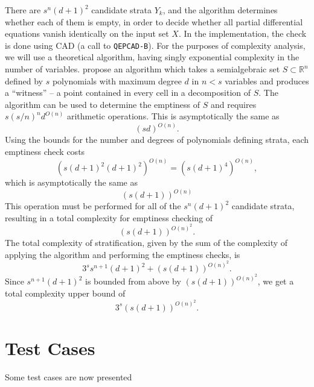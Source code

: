 \documentclass[
]{book}
\theoremstyle{definition}
\theoremstyle{definition}
\theoremstyle{definition}
\theoremstyle{definition}
\theoremstyle{remark}
\begin{document}
There are \(s^{n} (d + 1)^2\) candidate strata \(Y_k\), and the algorithm determines whether each of them is empty, in order to decide whether all partial differential equations vanish identically on the input set \(X\).
In the implementation, the check is done using CAD (a call to \texttt{QEPCAD-B}).
For the purposes of complexity analysis, we will use a theoretical algorithm, having singly exponential complexity in the number of variables.
\citet{bpr98} propose an algorithm which takes a semialgebraic set \(S \subset \mathbb{R}^n\) defined by \(s\) polynomials with maximum degree \(d\) in \(n < s\) variables and produces a ``witness'' -- a point contained in every cell in a decomposition of \(S\).
The algorithm can be used to determine the emptiness of \(S\) and requires \(s(s/n)^n d^{O(n)}\) arithmetic operations.
This is asymptotically the same as \[(sd)^{O(n)}.\]
Using the bounds for the number and degrees of polynomials defining strata, each emptiness check costs
\[
\left(s(d+1)^{2}(d+1)^{2}\right)^{O(n)}=\left(s(d+1)^{4}\right)^{O(n)},
\]
which is asymptotically the same as
\[
\left(s(d+1)\right)^{O(n)}
\]
This operation must be performed for all of the
\(s^{n} (d + 1)^{2}\)
candidate strata, resulting in a total complexity for emptiness checking of
\[
\left(s(d+1)\right)^{O(n)^{2}}.
\]
The total complexity of stratification, given by the sum of the complexity of applying the algorithm and performing the emptiness checks, is
\[
3^{s}s^{n+1}(d+1)^{2}+\left(s(d+1)\right)^{O(n)^{2}}.
\]
Since \(s^{n+1}(d+1)^{2}\) is bounded from above by \(\left(s(d+1)\right)^{O(n)^{2}}\), we get a total complexity upper bound of
\[
3^{s}\left(s(d+1)\right)^{O(n)^{2}}.
\]

\hypertarget{test-cases}{%
\section{Test Cases}\label{test-cases}}

Some test cases are now presented
\end{document}
